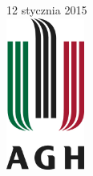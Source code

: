 \begin{titlepage}



{\large 12 stycznia 2015}\\[1cm] %



\includegraphics[height=50mm]{agh.jpg}%
 

\vfill %

\end{titlepage}